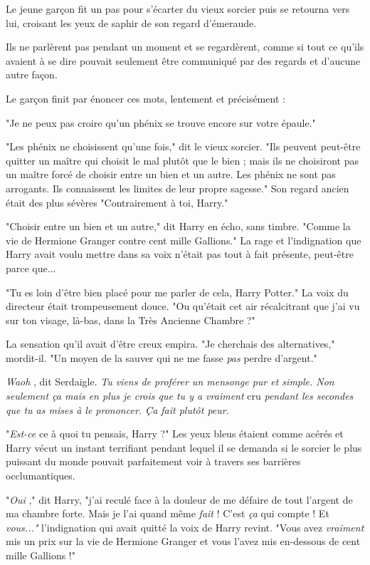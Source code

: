 Le jeune garçon fit un pas pour s'écarter du vieux sorcier puis se retourna vers lui, croisant les yeux de saphir de son regard d'émeraude.

Ils ne parlèrent pas pendant un moment et se regardèrent, comme si tout ce qu'ils avaient à se dire pouvait seulement être communiqué par des regards et d'aucune autre façon.

Le garçon finit par énoncer ces mots, lentement et précisément :

"Je ne peux pas croire qu'un phénix se trouve encore sur votre épaule."

"Les phénix ne choisissent qu'une fois," dit le vieux sorcier. "Ils peuvent peut-être quitter un maître qui choisit le mal plutôt que le bien ; mais ils ne choisiront pas un maître forcé de choisir entre un bien et un autre. Les phénix ne sont pas arrogants. Ils connaissent les limites de leur propre sagesse." Son regard ancien était des plus sévères "Contrairement à toi, Harry."

"Choisir entre un bien et un autre," dit Harry en écho, sans timbre. "Comme la vie de Hermione Granger contre cent mille Gallions." La rage et l'indignation que Harry avait voulu mettre dans sa voix n'était pas tout à fait présente, peut-être parce que...

"Tu es loin d'être bien placé pour me parler de cela, Harry Potter." La voix du directeur était trompeusement douce. "Ou qu'était cet air récalcitrant que j'ai vu sur ton visage, là-bas, dans la Très Ancienne Chambre ?"

La sensation qu'il avait d'être creux empira. "Je cherchais des alternatives," mordit-il. "Un moyen de la sauver qui ne me fasse \emph{pas}  perdre d'argent."

\emph{Waoh} , dit Serdaigle. \emph{Tu viens de proférer un mensonge pur et simple. Non seulement ça mais en plus je crois que tu y a vraiment } cru\emph{ pendant les secondes que tu as mises à le prononcer. Ça fait plutôt peur.} 

"\emph{Est-ce}  ce à quoi tu pensais, Harry ?" Les yeux bleus étaient comme acérés et Harry vécut un instant terrifiant pendant lequel il se demanda si le sorcier le plus puissant du monde pouvait parfaitement voir à travers ses barrières occlumantiques.

"\emph{Oui} ," dit Harry, "j'ai reculé face à la douleur de me défaire de tout l'argent de ma chambre forte. Mais je l'ai quand même \emph{fait } ! C'est \emph{ça}  qui compte ! Et \emph{vous..."}  l'indignation qui avait quitté la voix de Harry revint. "Vous avez \emph{vraiment}  mis un prix sur la vie de Hermione Granger et vous l'avez mis en-dessous de cent mille Gallions !"

